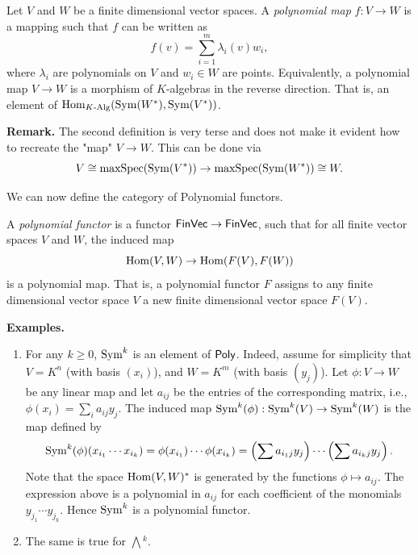 \documentclass[../main.tex]{subfiles}
\begin{document}
\begin{defi}
    Let $V$ and $W$ be a finite dimensional vector spaces. A \emph{polynomial map}
    $f: V \to W$ is a mapping such that $f$ can be written as 
    \begin{equation*}
        f(v) = \sum_{i=1}^m \lambda_i(v) w_i,
    \end{equation*}
    where $\lambda_i$ are polynomials on $V$ and $w_i \in W$ are points.
    Equivalently, a polynomial map $V \to W$ is a morphism of $K$-algebras in
    the reverse direction. That is, an element of $\operatorname{Hom}_{K\text{-Alg}}(\operatorname{Sym}(W^*),
    \operatorname{Sym}(V^*))$.
\end{defi}
\textbf{Remark.} 
The second definition is very terse and does not make it evident how to
recreate the "map" $V \to W$. This can be done via
$$V \cong \operatorname{maxSpec}(\operatorname{Sym}(V^*)) \to \operatorname{maxSpec}(\operatorname{Sym}(W^*)) \cong W.$$

We can now define the category of Polynomial functors.
\begin{defi}
    A \emph{polynomial functor} is a functor $\textnormal{$\textsf{FinVec}$} \to \textnormal{$\textsf{FinVec}$}$, such
    that for all finite vector spaces $V$ and $W$, the induced map
    \begin{equation*}
        \operatorname{Hom}(V, W) \to \operatorname{Hom}(F(V), F(W))
    \end{equation*} is a polynomial map. 
    That is, a polynomial functor $F$ assigns to any finite dimensional vector space $V$ 
    a new finite dimensional vector space $F(V)$. 
\end{defi}

\textbf{Examples.}
\begin{enumerate}[wide, labelindent=0pt,nolistsep]
    \item For any $k \geq 0$, $\operatorname{Sym}^k$ is an element of $\textnormal{$\textsf{Poly}$}$. Indeed, assume for
        simplicity that $V = K^n$ (with basis $(x_i)$), and $W = K^m$ (with
        basis $(y_j)$). Let $\phi: V \to W$ be 
        any linear map and let $a_{ij}$ be the entries of the corresponding matrix, 
        i.e., $\phi(x_i) = \sum_{i} a_{ij}y_j$. 
        The induced map $\operatorname{Sym}^k(\phi): \operatorname{Sym}^k(V) \to \operatorname{Sym}^k(W)$ is the map defined by
        \begin{equation*}
            \operatorname{Sym}^k(\phi)(x_{i_1} \cdots x_{i_k}) = \phi(x_{i_1}) \cdots \phi(x_{i_k})
            = \left(\sum a_{i_1j}y_j \right) \cdots \left(\sum a_{i_kj}y_j \right). 
        \end{equation*}
        Note that the space $\operatorname{Hom}(V,W)^*$ is generated by the functions 
        $\phi \mapsto a_{ij}$. The expression above is a polynomial in $a_{ij}$ for
        each coefficient of the monomials $y_{j_1}\cdots y_{j_k}$. Hence
        $\operatorname{Sym}^k$ is a polynomial functor.
    \item The same is true for $\bigwedge{}^k$.
\end{enumerate}
\end{document}
